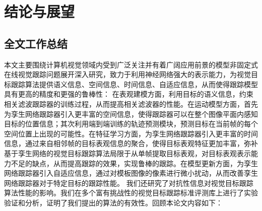 \chapter{结论与展望}\label{chap:conclusion}
\section{全文工作总结}
本文主要围绕计算机视觉领域内受到广泛关注并有着广阔应用前景的模型非固定式在线视觉跟踪问题展开深入研究，致力于利用神经网络强大的表示能力，为视觉目标跟踪算法提供语义信息、空间信息、时间信息、自适应信息，从而使得跟踪模型具有更高的精度和更强的鲁棒性：
在表观建模方面，利用目标的语义信息，约束相关滤波跟踪器的训练过程，从而提高相关滤波器的性能。在运动模型方面，首先为孪生网络跟踪器引入更丰富的空间信息，使得跟踪器可以在整个图像平面内感知目标的位置信息；其次利用端到端训练的轨迹预测模块，预测目标在当前帧的每个空间位置上出现的可能性。在特征学习方面，为孪生网络跟踪器引入更丰富的时间信息，通过来自相邻帧的目标表观信息的聚合，使得目标表观特征更加丰富，弥补基于孪生网络的视觉目标跟踪算法局限于从单帧提取目标表观，对目标表观表示能力不足的缺点，从而提高跟踪的效果，实现鲁棒的跟踪。在模型更新方面，为孪生网络跟踪器引入自适应信息，通过对模板图像的像素进行微小扰动，从而改善孪生网络跟踪器对于特定目标的跟踪性能。
我们还研究了对抗性信息对视觉目标跟踪算法性能的影响。我们在多个富有挑战性的视觉目标跟踪标准评测库上进行了实验验证和分析，证明了我们提出的算法的有效性。回顾本论文内容如下：
